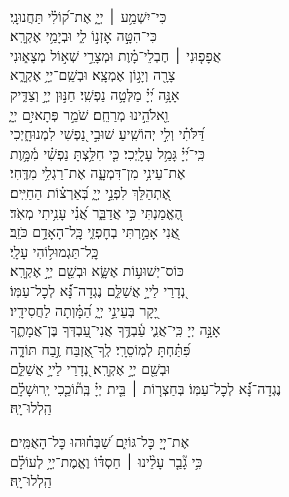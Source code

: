 \documentclass[twoside, openany, parskip=half, 11pt]{book}
\begin{document}
{\begin{narrow}
\\
 כִּי־יִשְׁמַ֥ע ׀ יְיָ֑ \hfill אֶת־ק֝וֹלִ֗י תַּחֲנוּנָֽי׃ \\
 כִּי־הִטָּ֣ה אׇזְנ֣וֹ לִ֑י \hfill וּבְיָמַ֥י אֶקְרָֽא׃ \\
 אֲפָפ֤וּנִי ׀ חֶבְלֵי־מָ֗וֶת \hfill וּמְצָרֵ֣י שְׁא֣וֹל מְצָא֑וּנִי\\ צָרָ֖ה וְיָג֣וֹן אֶמְצָֽא׃  \hfill
 וּבְשֵֽׁם־יְיָ֥ אֶקְרָ֑א\\ אָנָּ֥ה יְ֝יָ֗ מַלְּטָ֥ה נַפְשִֽׁי׃  \hfill
 חַנּ֣וּן יְיָ֣ וְצַדִּ֑יק\\ וֵ֖אלֹהֵ֣ינוּ מְרַחֵֽם׃  \hfill
 שֹׁמֵ֣ר פְּתָאיִ֣ם יְיָ֑\\ דַּ֝לֹּתִ֗י וְלִ֣י יְהוֹשִֽׁיעַ׃  \hfill
 שׁוּבִ֣י נַ֭פְשִׁי לִמְנוּחָ֑יְכִי\\ כִּֽי־יְ֝יָ֗ גָּמַ֥ל עָלָֽיְכִי׃  \hfill
 כִּ֤י חִלַּ֥צְתָּ נַפְשִׁ֗י מִ֫מָּ֥וֶת\\ אֶת־עֵינִ֥י מִן־דִּמְעָ֑ה \hfill אֶת־רַגְלִ֥י מִדֶּֽחִי׃ \\
 אֶ֭תְהַלֵּךְ לִפְנֵ֣י יְיָ֑ \hfill בְּ֝אַרְצ֗וֹת הַחַיִּֽים׃ \\
 הֶ֭אֱמַנְתִּי כִּ֣י אֲדַבֵּ֑ר \hfill אֲ֝נִ֗י עָנִ֥יתִי מְאֹֽד׃ \\
 אֲ֭נִי אָמַ֣רְתִּי בְחׇפְזִ֑י \hfill כׇּֽל־הָאָדָ֥ם כֹּזֵֽב׃ \\

 \hfill 
כׇּֽל־תַּגְמוּל֥וֹהִי עָלָֽי׃ \\
 כּוֹס־יְשׁוּע֥וֹת אֶשָּׂ֑א \hfill וּבְשֵׁ֖ם יְיָ֣ אֶקְרָֽא׃ \\
 נְ֭דָרַי לַייָ֣ אֲשַׁלֵּ֑ם \hfill נֶגְדָה־נָּ֗֝א לְכׇל־עַמּֽוֹ׃ \\
 יָ֭קָר בְּעֵינֵ֣י יְיָ֑ \hfill הַ֝מָּ֗וְתָה לַחֲסִידָֽיו׃ \\
 אָנָּ֣ה יְיָ כִּֽי־אֲנִ֢י עַ֫בְדֶּ֥ךָ \hfill אֲנִי־עַ֭בְדְּךָ בֶּן־אֲמָתֶ֑ךָ\\ פִּ֝תַּ֗חְתָּ לְמֽוֹסֵרָֽי׃  \hfill
 לְֽךָ־אֶ֭זְבַּח זֶ֣בַח תּוֹדָ֑ה\\ וּבְשֵׁ֖ם יְיָ֣ אֶקְרָֽא׃  \hfill
 נְ֭דָרַי לַייָ֣ אֲשַׁלֵּ֑ם \\ נֶגְדָה־נָּ֗֝א לְכׇל־עַמּֽוֹ׃  \hfill
 בְּחַצְר֤וֹת ׀ בֵּ֤ית יְיָ֗ בְּֽת֘וֹכֵ֤כִי יְֽרוּשָׁלָ֗‍ִם\\
  הַֽלְלוּ־יָֽהּ׃  \hfill \break



 אֶת־יְיָ֭ כׇּל־גּוֹיִ֑ם \hfill שַׁ֝בְּח֗וּהוּ כׇּל־הָאֻמִּֽים׃ \\
 כִּ֥י גָ֘בַ֤ר עָלֵ֨ינוּ ׀ חַסְדּ֗וֹ \hfill וֶאֱמֶת־יְיָ֥ לְעוֹלָ֗ם\\
  הַֽלְלוּ־יָֽהּ׃ \hfill \break


\end{narrow}}
\end{document}
